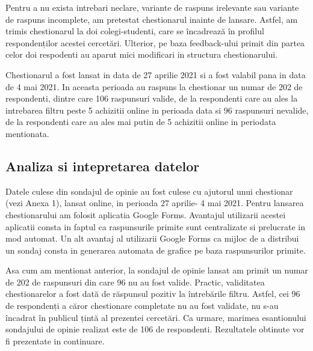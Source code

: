 \documentclass[a4paper, 12pt]{article}
\begin{document}
		\quad Pentru a nu exista intrebari neclare, variante de raspuns irelevante sau variante de raspuns incomplete, am pretestat chestionarul inainte de lansare. Astfel, am trimis chestionarul la doi colegi-studenti, care se încadrează în profilul respondenților acestei cercetări. Ulterior, pe baza feedback-ului primit din partea celor doi respodenti au aparut mici modificari in structura chestionarului.
		
		\quad Chestionarul a fost lansat in data de 27 aprilie 2021 si a fost valabil pana in data de 4 mai 2021. In aceasta perioada au raspuns la chestionar un numar de 202 de respondenti, dintre care 106 raspunsuri valide, de la respondenti care au ales la intrebarea filtru peste 5 achizitii online in perioada data si 96 raspunsuri nevalide, de la respondenti care au ales mai putin de 5 achizitii online in periodata mentionata.
	
		
	\subsection{Analiza si intepretarea datelor}
		\qquad Datele culese din sondajul de opinie au fost culese cu ajutorul unui chestionar (vezi Anexa 1), lansat online, in perioada 27 aprilie- 4 mai 2021. Pentru lansarea chestionarului am folosit aplicatia Google Forms. Avantajul utilizarii acestei aplicatii consta in faptul ca raspunsurile primite sunt centralizate si prelucrate in mod automat. Un alt avantaj al utilizarii Google Forms ca mijloc de a distribui un sondaj consta in generarea automata de grafice pe baza raspunsurilor primite. 
		
		\qquad Asa cum am mentionat anterior, la sondajul de opinie lansat am primit un numar de 202 de raspunsuri din care 96 nu au fost valide. Practic, validitatea chestionarelor a fost dată de răspunsul pozitiv la întrebările filtru. Astfel, cei 96 de respondenți a căror chestionare completate nu au fost validate, nu s-au încadrat în publicul țintă al prezentei cercetări.  Ca urmare, marimea esantionului sondajului de opinie realizat este de 106 de respondenti. Rezultatele obtinute vor fi prezentate in continuare.
		
\end{document}
